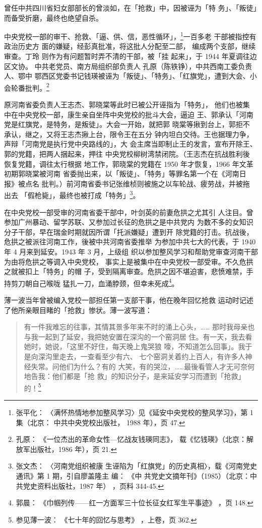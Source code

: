 曾任中共四川省妇女部部长的曾淡如，在「抢救」中，因被诬为「特
务」、「叛徒」而备受折磨，最终也绝望自杀。

中央党校一部的审干、抢救、「逼、供、信，恶性循环」，\footnote{张平化：
〈满怀热情地参加整风学习〉见《延安中央党校的整风学习》，第 1 集（北京：
中共中央党校出版社， 1988 年），页 47.}一百多老 干部被指控有政治历史方
面的嫌疑，经彭真批准，将这批人分配至二部， 编成两个支部，继续审查。丁玲
则作为有问题暂时弄不清的干部，被「挂 起来」，于 1944 年夏调往边区文协。
中共老党员、南方局组织部负责人 孔原（陈铁铮），中共西南工委负责人、鄂中
鄂西区党委书记钱瑛被诬为「叛徒」、「特务」、「红旗党」，遭到大会、小
会轮番批判。\footnote{孔原： 《一位杰出的革命女性---忆战友钱瑛同志》，
载《忆钱瑛》（北京：解放军出版社，1986 年），页 21.} 

原河南省委负责人王志杰、郭晓棠等此时已被公开诬指为「特务」， 他们也被集
中在中央党校一部，康生亲自坐阵中央党校的批斗大会，逼迫 王、郭承认「河南
党是红旗党，是特务，是叛徒」。大会一开始，就把郭 晓棠等揪到台上，郭拒不
承认，继之，又将王志杰揪上台，限令王在五分 钟内坦白交待。王也据理力争，
声辩「河南党是执行党中央路线的」，大 会主席当即制止王的发言，宣布开除王、
郭的党籍，把两人捆起来，押往 中央党校柳树湾禁闭院。（王志杰在抗战胜利後
恢复党籍，调往太行根据 地工作，郭晓棠的党籍在 1950 年才恢复，1966 年文革
初期郭晓棠被河南 省委抛出来，以「叛徒」、「特务」等罪名第一个在《河南日
报》被点名 批判。）前河南省委书记张维桢则被施之以车轮战、疲劳战，并被拖
出去 「假枪毙」，最终也被打成「特务」\footnote{张文杰： 〈河南党组织被康
生诬陷为「红旗党」的历史真相〉，载《河南党史通讯》第 1 期，引自廖盖隆主
编： 《中 共党史文摘年刊》（1985）（北京：中共党史资料出版社，1987 年）
，页料 344-45.}。
 
在中央党校一部受审的河南省委干部中，叶剑英的前妻危拱之尤其引
人注目。曾参加广州暴动、留学苏联、又参加过长征的危拱之是中共党内
为数不多的女知识分子干部，早在瑞金时期就因所谓「托派嫌疑」遭到开
除党籍的打击。抗战後，危拱之被派往河南工作，後被中共河南省委推举
为参加中共七大的代表，于 1940 年 4 月来到延安。1943 年 3 月，上级组
织以参加整风学习和帮助党审查河南干部为由将危拱之等调入中央党校，
事实上是被集中在中央党校一部受审。不久危拱之就被扣上「特务」的帽
子，受到隔离审查。危拱之因不堪迫害，悲愤难禁，手持剪刀朝自己喉咙
猛扎一刀，血涌脖颈，但幸未死成\footnote{郭晨：
《巾帼列传——红一方面军三十位长征女红军生平事迹》
，页 148.}。

薄一波当年曾被编入党校一部担任第一支部干事，他在晚年回忆抢救
运动时记述了他所亲眼目睹的「抢救」惨状。薄一波写道：
\begin{quote}
	\fzwkai 有一件我难忘的往事，其情其景多年来不时的涌上心头，……
那时我母亲也与我一起到了延安，我把她安置在深沟的一个窑洞居
住。有一天，我去看她时，她说，「这里不好住，每天晚上鬼哭狼
嚎，不知道怎么回事」。我于是向深沟里走去，一查看至少有六、
七个窑洞关着约上百人，有许多人神经失常。问他们为什么？有的
大笑，有的哭泣，……最後看管人才无可奈何地告我：他们都是「抢
救」的知识分子，是来延安学习而遭到「抢救」的！\footnote{参见薄一波：
《七十年的回忆与思考》
，上卷，页 362.} 
\end{quote}

